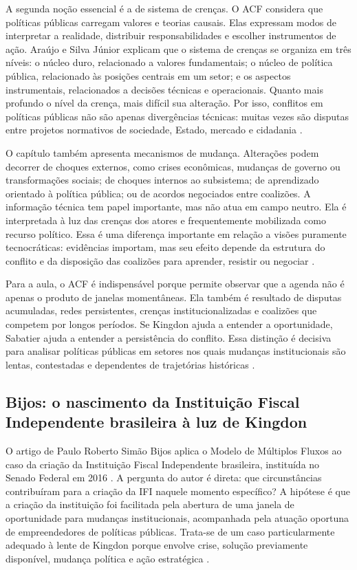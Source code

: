 \documentclass[12pt,a4paper]{article}
\begin{document}
A segunda noção essencial é a de sistema de crenças. O ACF considera que políticas públicas carregam valores e teorias causais. Elas expressam modos de interpretar a realidade, distribuir responsabilidades e escolher instrumentos de ação. Araújo e Silva Júnior explicam que o sistema de crenças se organiza em três níveis: o núcleo duro, relacionado a valores fundamentais; o núcleo de política pública, relacionado às posições centrais em um setor; e os aspectos instrumentais, relacionados a decisões técnicas e operacionais. Quanto mais profundo o nível da crença, mais difícil sua alteração. Por isso, conflitos em políticas públicas não são apenas divergências técnicas: muitas vezes são disputas entre projetos normativos de sociedade, Estado, mercado e cidadania \autocites{sabatier1999theories}[][]{araujoSilva2022coalizoes}.

O capítulo também apresenta mecanismos de mudança. Alterações podem decorrer de choques externos, como crises econômicas, mudanças de governo ou transformações sociais; de choques internos ao subsistema; de aprendizado orientado à política pública; ou de acordos negociados entre coalizões. A informação técnica tem papel importante, mas não atua em campo neutro. Ela é interpretada à luz das crenças dos atores e frequentemente mobilizada como recurso político. Essa é uma diferença importante em relação a visões puramente tecnocráticas: evidências importam, mas seu efeito depende da estrutura do conflito e da disposição das coalizões para aprender, resistir ou negociar \autocite{araujoSilva2022coalizoes}.

Para a aula, o ACF é indispensável porque permite observar que a agenda não é apenas o produto de janelas momentâneas. Ela também é resultado de disputas acumuladas, redes persistentes, crenças institucionalizadas e coalizões que competem por longos períodos. Se Kingdon ajuda a entender a oportunidade, Sabatier ajuda a entender a persistência do conflito. Essa distinção é decisiva para analisar políticas públicas em setores nos quais mudanças institucionais são lentas, contestadas e dependentes de trajetórias históricas \autocites{kingdon2003agendas}[][]{sabatier1999theories}.

\subsection{Bijos: o nascimento da Instituição Fiscal Independente brasileira à luz de Kingdon}
\label{sec:org7250609}
O artigo de Paulo Roberto Simão Bijos aplica o Modelo de Múltiplos Fluxos ao caso da criação da Instituição Fiscal Independente brasileira, instituída no Senado Federal em 2016 \autocite{bijos2024ifi}. A pergunta do autor é direta: que circunstâncias contribuíram para a criação da IFI naquele momento específico? A hipótese é que a criação da instituição foi facilitada pela abertura de uma janela de oportunidade para mudanças institucionais, acompanhada pela atuação oportuna de empreendedores de políticas públicas. Trata-se de um caso particularmente adequado à lente de Kingdon porque envolve crise, solução previamente disponível, mudança política e ação estratégica \autocites{kingdon2003agendas}[][]{bijos2024ifi}.
\end{document}

